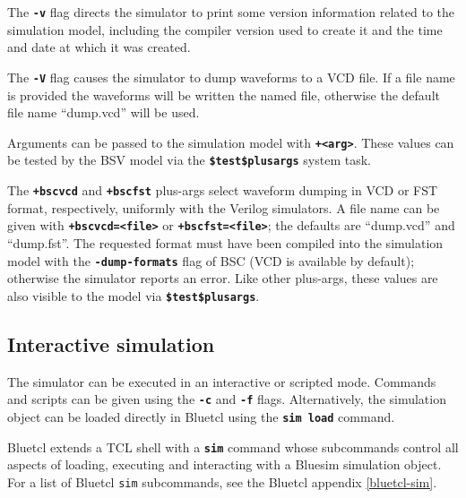 \documentclass{article}
\newcommand{\te}[1]{\texttt{#1}}
\begin{document}
The {\bf\tt -v} flag directs the simulator to print some version
information related to the simulation model, including the compiler
version used to create it and the time and date at which it was created.

The {\bf\tt -V} flag causes the simulator to dump waveforms to a VCD
file.  If a file name is provided the waveforms will be written the
named file, otherwise the default file name ``dump.vcd'' will be used.

Arguments can be passed to the simulation model with {\bf\tt +<arg>}.
These values can be tested by the BSV model via the {\bf\tt \$test\$plusargs}
system task.

The {\bf\tt +bscvcd} and {\bf\tt +bscfst} plus-args select waveform
dumping in VCD or FST format, respectively, uniformly with the
Verilog simulators.  A file name can be given with
{\bf\tt +bscvcd=<file>} or {\bf\tt +bscfst=<file>}; the defaults are
``dump.vcd'' and ``dump.fst''.  The requested format must have been
compiled into the simulation model with the {\bf\tt -dump-formats}
flag of BSC (VCD is available by default); otherwise the simulator
reports an error.  Like other plus-args, these values are also
visible to the model via {\bf\tt \$test\$plusargs}.


\subsection{Interactive simulation}
\label{bluesim-interactive}

The simulator can be executed in an interactive or scripted mode.
Commands and scripts can be given using the {\bf\tt -c} and
{\bf\tt -f} flags.  Alternatively, the simulation object can be loaded
directly in Bluetcl using the {\bf\tt sim load} command.


Bluetcl extends a TCL shell with a {\bf\tt sim} command whose
subcommands control all aspects of loading, executing and interacting
with a Bluesim simulation object.  For a list of Bluetcl \te{sim}
subcommands, see the Bluetcl appendix \ref{bluetcl-sim}.
\end{document}
